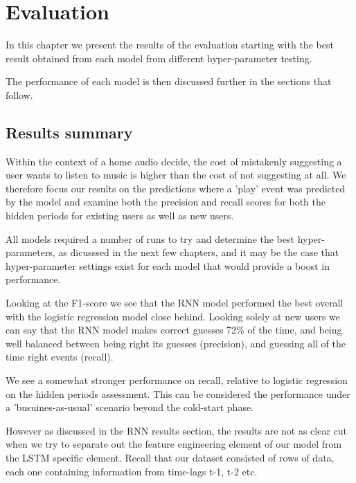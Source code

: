 
\chapter{Evaluation} %

\label{Chapter5} %

In this chapter we present the results of the evaluation starting with the best result obtained from each model from different hyper-parameter testing.

The performance of each model is then discussed further in the sections that follow. 

\section{Results summary}

Within the context of a home audio decide, the cost of mistakenly suggesting a user wants to listen to music is higher than the cost of not suggesting at all. We therefore focus our results on the predictions where a 'play' event was predicted by the model and examine both the precision and recall scores for both the hidden periods for existing users as well as new users.

All models required a number of runs to try and determine the best hyper-parameters, as dicusssed in the next few chapters, and it may be the case that hyper-parameter settings exist for each model that would provide a boost in performance.

Looking at the F1-score we see that the RNN model performed the best overall with the logistic regression model close behind. Looking solely at new users we can say that the RNN model makes correct guesses 72\% of the time, and being well balanced between being right its guesses (precision), and guessing all of the time right events (recall). 

We see a somewhat stronger performance on recall, relative to logistic regression on the hidden periods assessment. This can be considered the performance under a 'busuines-as-usual' scenario beyond the cold-start phase. 

However as discussed in the RNN results section, the results are not as clear cut when we try to separate out the feature engineering element of our model from the LSTM specific element. Recall that our dataset consisted of rows of data, each one containing information from time-lags t-1, t-2 etc.


